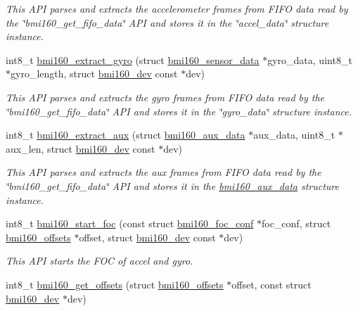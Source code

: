 \begin{DoxyCompactItemize}
\begin{DoxyCompactList}\small\item\em This A\+PI parses and extracts the accelerometer frames from F\+I\+FO data read by the \char`\"{}bmi160\+\_\+get\+\_\+fifo\+\_\+data\char`\"{} A\+PI and stores it in the \char`\"{}accel\+\_\+data\char`\"{} structure instance. \end{DoxyCompactList}\item 
int8\+\_\+t \hyperlink{group__bmi160_ga9b2caa7d4a697e555856dfc6d1c17990}{bmi160\+\_\+extract\+\_\+gyro} (struct \hyperlink{structbmi160__sensor__data}{bmi160\+\_\+sensor\+\_\+data} $\ast$gyro\+\_\+data, uint8\+\_\+t $\ast$gyro\+\_\+length, struct \hyperlink{structbmi160__dev}{bmi160\+\_\+dev} const $\ast$dev)
\begin{DoxyCompactList}\small\item\em This A\+PI parses and extracts the gyro frames from F\+I\+FO data read by the \char`\"{}bmi160\+\_\+get\+\_\+fifo\+\_\+data\char`\"{} A\+PI and stores it in the \char`\"{}gyro\+\_\+data\char`\"{} structure instance. \end{DoxyCompactList}\item 
int8\+\_\+t \hyperlink{group__bmi160_gab21ca26b7df608549e5d1bd583e4d52a}{bmi160\+\_\+extract\+\_\+aux} (struct \hyperlink{structbmi160__aux__data}{bmi160\+\_\+aux\+\_\+data} $\ast$aux\+\_\+data, uint8\+\_\+t $\ast$aux\+\_\+len, struct \hyperlink{structbmi160__dev}{bmi160\+\_\+dev} const $\ast$dev)
\begin{DoxyCompactList}\small\item\em This A\+PI parses and extracts the aux frames from F\+I\+FO data read by the \char`\"{}bmi160\+\_\+get\+\_\+fifo\+\_\+data\char`\"{} A\+PI and stores it in the \hyperlink{structbmi160__aux__data}{bmi160\+\_\+aux\+\_\+data} structure instance. \end{DoxyCompactList}\item 
int8\+\_\+t \hyperlink{group__bmi160_ga9a12ab7ac43b795f4b6faddde505eb88}{bmi160\+\_\+start\+\_\+foc} (const struct \hyperlink{structbmi160__foc__conf}{bmi160\+\_\+foc\+\_\+conf} $\ast$foc\+\_\+conf, struct \hyperlink{structbmi160__offsets}{bmi160\+\_\+offsets} $\ast$offset, struct \hyperlink{structbmi160__dev}{bmi160\+\_\+dev} const $\ast$dev)
\begin{DoxyCompactList}\small\item\em This A\+PI starts the F\+OC of accel and gyro. \end{DoxyCompactList}\item 
int8\+\_\+t \hyperlink{group__bmi160_gac6d11bee70aafd12449413c0fce3f014}{bmi160\+\_\+get\+\_\+offsets} (struct \hyperlink{structbmi160__offsets}{bmi160\+\_\+offsets} $\ast$offset, const struct \hyperlink{structbmi160__dev}{bmi160\+\_\+dev} $\ast$dev)

\end{DoxyCompactItemize}
